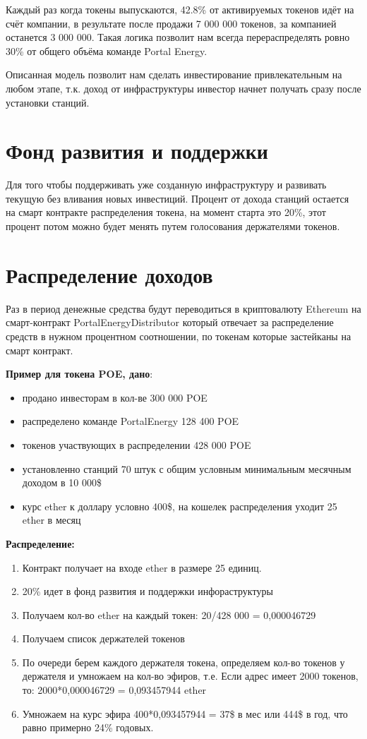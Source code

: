 \documentclass[a4paper,12pt]{report}
\begin{document}
Каждый раз когда токены выпускаются, 42.8\% от активируемых токенов идёт на счёт компании, в результате после продажи 7 000 000 токенов, за компанией останется 3 000 000. Такая логика позволит нам всегда перераспределять ровно 30\% от общего объёма команде Portal Energy.

Описанная модель позволит нам сделать инвестирование привлекательным на любом этапе, т.к. доход от инфраструктуры инвестор начнет получать сразу после установки станций. 

\section{Фонд развития и поддержки}
\label{storage}
Для того чтобы поддерживать уже созданную инфраструктуру и развивать текущую без вливания новых инвестиций.
Процент от дохода станций остается на смарт контракте распределения токена, на момент старта это 20\%, этот процент потом можно будет менять путем голосования держателями токенов. 

\section{Распределение доходов}
\label{capital}
Раз в период денежные средства будут переводиться в криптовалюту Ethereum на смарт-контракт PortalEnergyDistributor который отвечает за распределение средств в нужном процентном соотношении, по токенам которые застейканы на смарт контракт.

\textbf{Пример для токена POE, дано}:

\begin{itemize}
	\item продано инвесторам в кол-ве 300 000 POE
	\item распределено команде PortalEnergy 128 400 POE
	\item токенов участвующих в распределении 428 000 POE
	\item установленно станций 70 штук с общим условным минимальным месячным доходом в 10 000\$
	\item курс ether к доллару условно 400\$,  на кошелек распределения уходит 25 ether в месяц
\end{itemize}

\textbf{Распределение:}

\begin{enumerate}
	\item Контракт получает на входе ether в размере 25 единиц.
	\item 20\% идет в фонд развития и поддержки инфораструктуры
	\item Получаем кол-во ether на каждый токен: 20/428 000 = 0,000046729
	\item Получаем список держателей токенов
	\item По очереди берем каждого держателя токена, определяем кол-во токенов у держателя и умножаем на кол-во эфиров, т.е. Если адрес имеет 2000 токенов, то: 2000*0,000046729 = 0,093457944 ether
	\item Умножаем на курс эфира 400*0,093457944 = 37\$ в мес или 444\$ в год, что равно примерно 24\% годовых. 
\end{enumerate}
\end{document}
